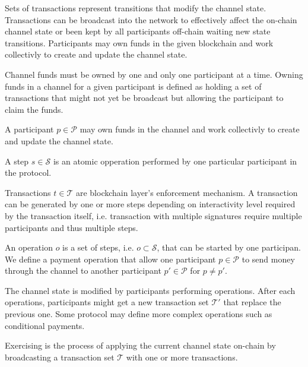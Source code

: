 \documentclass{llncs}
\begin{document}
Sets of transactions represent transitions that modify the channel state. Transactions can be broadcast into the network to effectively affect the on-chain channel state or been kept by all participants off-chain waiting new state transitions. Participants may own funds in the given blockchain and work collectivly to create and update the channel state.

Channel funds must be owned by one and only one participant at a time. Owning funds in a channel for a given participant is defined as holding a set of transactions that might not yet be broadcast but allowing the participant to claim the funds.

\begin{definition}[Participant] A participant $p \in \mathcal{P}$ may own funds in the channel and work collectivly to create and update the channel state.
\end{definition}

\begin{definition}[Step] A step $s \in \mathcal{S}$ is an atomic opperation performed by one particular participant in the protocol.
\end{definition}

\begin{definition}[Transaction] Transactions $t \in \mathcal{T}$ are blockchain layer's enforcement mechanism. A transaction can be generated by one or more steps depending on interactivity level required by the transaction itself, i.e. transaction with multiple signatures require multiple participants and thus multiple steps.
\end{definition}

\begin{definition}[Operation] An operation $o$ is a set of steps, i.e. $o \subset \mathcal{S}$, that can be started by one participan. We define a payment operation that allow one participant $p \in \mathcal{P}$ to send money through the channel to another participant $p' \in \mathcal{P}$ for $p \neq p'$.
\end{definition}

The channel state is modified by participants performing operations. After each operations, participants might get a new transaction set $\mathcal{T'}$ that replace the previous one. Some protocol may define more complex operations such as conditional payments.

\begin{definition}[Exercise] Exercising is the process of applying the current channel state on-chain by broadcasting a transaction set $\mathcal{T}$ with one or more transactions.
\end{definition}
\end{document}
